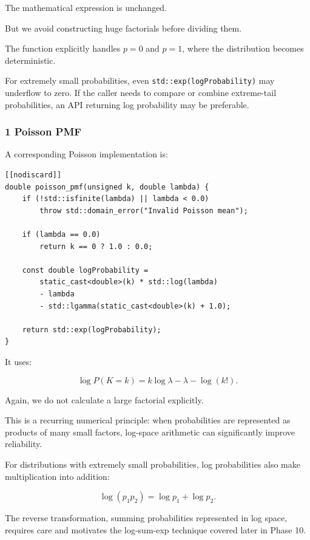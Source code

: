 The mathematical expression is unchanged.

But we avoid constructing huge factorials before dividing them.

The function explicitly handles \(p=0\) and \(p=1\), where the distribution becomes deterministic.

For extremely small probabilities, even \texttt{std::exp(logProbability)} may underflow to zero. If the caller needs to compare or combine extreme-tail probabilities, an API returning log probability may be preferable.

\subsubsection{1 Poisson PMF}\label{02-foundations-ii-ch031-poisson-pmf}

\hypertarget{02-foundations-ii-ch031-poisson-pmf}{}

A corresponding Poisson implementation is:

\begin{verbatim}
[[nodiscard]]
double poisson_pmf(unsigned k, double lambda) {
    if (!std::isfinite(lambda) || lambda < 0.0)
        throw std::domain_error("Invalid Poisson mean");

    if (lambda == 0.0)
        return k == 0 ? 1.0 : 0.0;

    const double logProbability =
        static_cast<double>(k) * std::log(lambda)
        - lambda
        - std::lgamma(static_cast<double>(k) + 1.0);

    return std::exp(logProbability);
}
\end{verbatim}

It uses:

\[
 \log P(K=k) = k\log\lambda-\lambda-\log(k!).
\]

Again, we do not calculate a large factorial explicitly.

This is a recurring numerical principle: when probabilities are represented as products of many small factors, log-space arithmetic can significantly improve reliability.

For distributions with extremely small probabilities, log probabilities also make multiplication into addition:

\[
 \log(p_1p_2)=\log p_1+\log p_2.
\]

The reverse transformation, summing probabilities represented in log space, requires care and motivates the log-sum-exp technique covered later in Phase 10.

